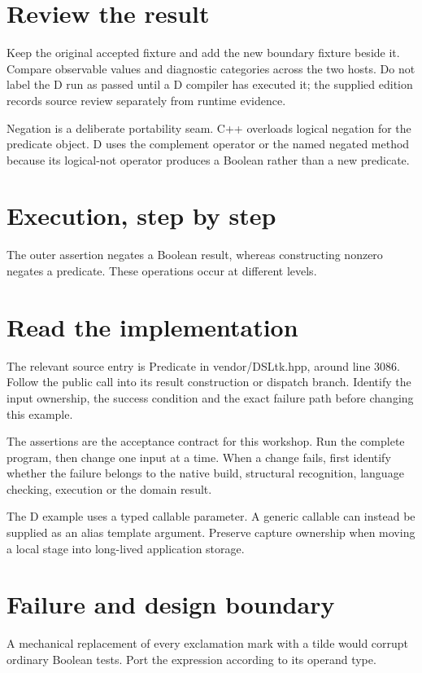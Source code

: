 \section*{Review the result}
Keep the original accepted fixture and add the new boundary fixture beside it. Compare observable values and diagnostic categories across the two hosts. Do not label the D run as passed until a D compiler has executed it; the supplied edition records source review separately from runtime evidence.

\clearpage
{}
Negation is a deliberate portability seam. C++ overloads logical negation for the predicate object. D uses the complement operator or the named negated method because its logical-not operator produces a Boolean rather than a new predicate.


\section*{Execution, step by step}
The outer assertion negates a Boolean result, whereas constructing nonzero negates a predicate. These operations occur at different levels.

\section*{Read the implementation}
The relevant source entry is Predicate in vendor/DSLtk.hpp, around line 3086. Follow the public call into its result construction or dispatch branch. Identify the input ownership, the success condition and the exact failure path before changing this example.

The assertions are the acceptance contract for this workshop. Run the complete program, then change one input at a time. When a change fails, first identify whether the failure belongs to the native build, structural recognition, language checking, execution or the domain result.

\clearpage
{}
The D example uses a typed callable parameter. A generic callable can instead be supplied as an alias template argument. Preserve capture ownership when moving a local stage into long-lived application storage.


\section*{Failure and design boundary}
A mechanical replacement of every exclamation mark with a tilde would corrupt ordinary Boolean tests. Port the expression according to its operand type.

